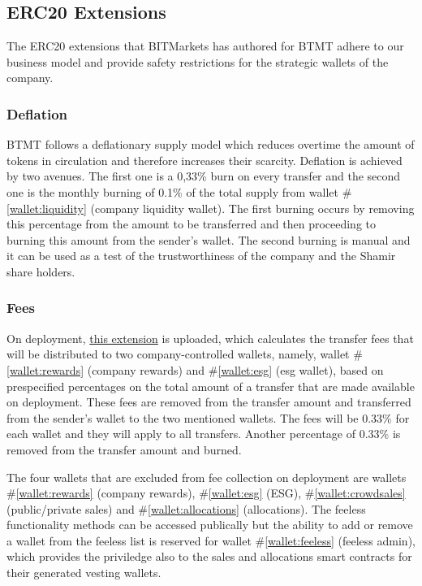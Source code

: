 \documentclass[a4paper,12pt]{article}
\begin{document}
\subsection{ERC20 Extensions}
The ERC20 extensions that BITMarkets has authored for BTMT adhere to our business model and provide safety restrictions for the strategic wallets of the company.

\subsubsection{Deflation}

BTMT follows a deflationary supply model which reduces overtime the amount of tokens in circulation and therefore increases their scarcity. Deflation is achieved by two avenues. The first one is a 0,33\% burn on every transfer and the second one is the monthly burning of 0.1\% of the total supply from wallet \#\ref{wallet:liquidity} (company liquidity wallet). The first burning occurs by removing this percentage from the amount to be transferred and then proceeding to burning this amount from the sender's wallet.
The second burning is manual and it can be used as a test of the trustworthiness of the company and the Shamir share holders.

\subsubsection{Fees}

On deployment, \href{https://github.com/UAB-BITmarkets/token/blob/master/contracts/token/ERC20Fees.sol}{this extension} is uploaded, which calculates the transfer fees that will be distributed to two company-controlled wallets, namely, wallet \#\ref{wallet:rewards} (company rewards) and \#\ref{wallet:esg} (esg wallet), based on prespecified percentages on the total amount of a transfer that are made available on deployment. These fees are removed from the transfer amount and transferred from the sender's wallet to the two mentioned wallets.
The fees will be 0.33\% for each wallet and they will apply to all transfers. Another percentage of 0.33\% is removed from the transfer
amount and burned.

The four wallets that are excluded from fee collection on deployment are wallets \#\ref{wallet:rewards} (company rewards), \#\ref{wallet:esg} (ESG), \#\ref{wallet:crowdsales} (public/private sales) and \#\ref{wallet:allocations} (allocations).
The feeless functionality methods can be accessed publically but the ability to add or remove a wallet from the feeless list is reserved for wallet \#\ref{wallet:feeless} (feeless admin), which provides the priviledge also to the sales and allocations smart contracts for their generated vesting wallets.
\end{document}

